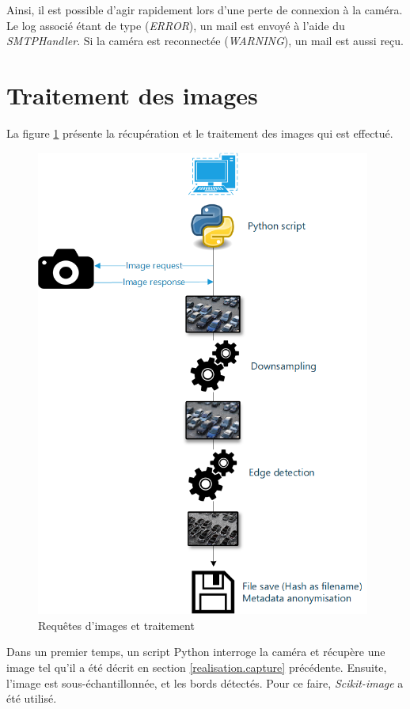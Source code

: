 Ainsi, il est possible d'agir rapidement lors d'une perte de connexion à la caméra. Le log associé étant de type (\textit{ERROR}), un mail est envoyé à l'aide du \textit{SMTPHandler}. Si la caméra est reconnectée (\textit{WARNING}), un mail est aussi reçu.

\section{Traitement des images}\label{realisation.traitement}

La figure \ref{fig:image_process} présente la récupération et le traitement des images qui est effectué.

\begin{figure}[ht]
    \includegraphics[width=110mm]{img/realisation/image_process.png}
    \centering
    \caption{Requêtes d'images et traitement}
    \label{fig:image_process}
\end{figure} 

Dans un premier temps, un script Python interroge la caméra et récupère une image tel qu'il a été décrit en section \ref{realisation.capture} précédente. Ensuite, l'image est sous-échantillonnée, et les bords détectés. Pour ce faire, \textit{Scikit-image} a été utilisé.

